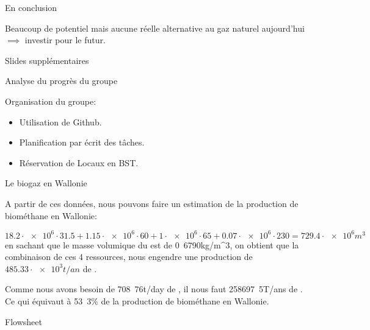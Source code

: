 \documentclass{beamer}
\begin{document}
\begin{frame}{En conclusion}
    \begin{center}
	    Beaucoup de potentiel mais aucune réelle alternative au gaz naturel aujourd'hui\\[1em]
	    $\implies$ investir pour le futur.
    \end{center}
\end{frame}

\begin{frame}
\begin{center}
Slides supplémentaires
\end{center}
\end{frame}
\begin{frame}{Analyse du progrès du groupe}

		\begin{center}
		Organisation du groupe:
			\begin{itemize}
			\item Utilisation de Github.
			\item Planification par écrit des tâches.
			\item Réservation de Locaux en BST.
			\end{itemize}
		\end{center}

\end{frame}

\begin{frame}[allowframebreaks]{Le biogaz en Wallonie}
		\begin{center}
\end{center}


A partir de ces données, nous pouvons faire un estimation de la production de biométhane en Wallonie:

$$18.2\cdot \num{e6} \cdot 31.5 + 1.15\cdot \num{e6} \cdot 60 + 1\cdot \num{e6} \cdot 65 + 0.07\cdot \num{e6} \cdot 230 = \unit{729.4\cdot \num{e6}}{m^3}$$ en sachant que le masse volumique du  est de \unit{0.6790}{kg/m^3},
on obtient que la combinaison de ces 4 ressources, nous engendre une production de $\unit{485.33 \cdot \num{e3}}{t/an}$ de .

Comme nous avons besoin de \unit{708.76}{t/day} de , il nous faut \unit{258697.5}{T/ans} de . Ce qui équivaut à \unit{53.3}{\%} de la production de biométhane en Wallonie.

\end{frame}

\begin{frame}{Flowsheet}
\begin{center}
\resizebox{6cm}{6cm}{
	}
\end{center}
\end{frame}
\end{document}

